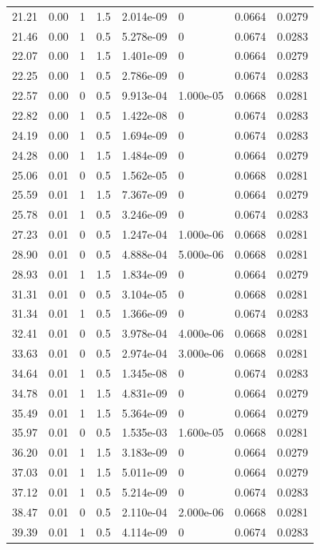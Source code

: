 \documentclass[preview]{standalone}
\begin{document}
{{\begin{tabular}{L{1.2cm}C{1.2cm} C{0.3cm}C{0.5cm} C{1.4cm}C{1.4cm} C{1.4cm}C{1.4cm}}
  21.21  &  0.00  & 1     & 1.5 &  2.014e-09  & 0  & 0.0664 &  0.0279   \\ 
  21.46  &  0.00  & 1     & 0.5 &  5.278e-09  & 0  & 0.0674 &  0.0283   \\ 
  22.07  &  0.00  & 1     & 1.5 &  1.401e-09  & 0  & 0.0664 &  0.0279   \\ 
  22.25  &  0.00  & 1     & 0.5 &  2.786e-09  & 0  & 0.0674 &  0.0283   \\ 
  22.57  &  0.00  & 0     & 0.5 &  9.913e-04  & 1.000e-05  & 0.0668 &  0.0281   \\ 
  22.82  &  0.00  & 1     & 0.5 &  1.422e-08  & 0  & 0.0674 &  0.0283   \\ 
  24.19  &  0.00  & 1     & 0.5 &  1.694e-09  & 0  & 0.0674 &  0.0283   \\ 
  24.28  &  0.00  & 1     & 1.5 &  1.484e-09  & 0  & 0.0664 &  0.0279   \\ 
  25.06  &  0.01  & 0     & 0.5 &  1.562e-05  & 0  & 0.0668 &  0.0281   \\ 
  25.59  &  0.01  & 1     & 1.5 &  7.367e-09  & 0  & 0.0664 &  0.0279   \\ 
  25.78  &  0.01  & 1     & 0.5 &  3.246e-09  & 0  & 0.0674 &  0.0283   \\ 
  27.23  &  0.01  & 0     & 0.5 &  1.247e-04  & 1.000e-06  & 0.0668 &  0.0281   \\ 
  28.90  &  0.01  & 0     & 0.5 &  4.888e-04  & 5.000e-06  & 0.0668 &  0.0281   \\ 
  28.93  &  0.01  & 1     & 1.5 &  1.834e-09  & 0  & 0.0664 &  0.0279   \\ 
  31.31  &  0.01  & 0     & 0.5 &  3.104e-05  & 0  & 0.0668 &  0.0281   \\ 
  31.34  &  0.01  & 1     & 0.5 &  1.366e-09  & 0  & 0.0674 &  0.0283   \\ 
  32.41  &  0.01  & 0     & 0.5 &  3.978e-04  & 4.000e-06  & 0.0668 &  0.0281   \\ 
  33.63  &  0.01  & 0     & 0.5 &  2.974e-04  & 3.000e-06  & 0.0668 &  0.0281   \\ 
  34.64  &  0.01  & 1     & 0.5 &  1.345e-08  & 0  & 0.0674 &  0.0283   \\ 
  34.78  &  0.01  & 1     & 1.5 &  4.831e-09  & 0  & 0.0664 &  0.0279   \\ 
  35.49  &  0.01  & 1     & 1.5 &  5.364e-09  & 0  & 0.0664 &  0.0279   \\ 
  35.97  &  0.01  & 0     & 0.5 &  1.535e-03  & 1.600e-05  & 0.0668 &  0.0281   \\ 
  36.20  &  0.01  & 1     & 1.5 &  3.183e-09  & 0  & 0.0664 &  0.0279   \\ 
  37.03  &  0.01  & 1     & 1.5 &  5.011e-09  & 0  & 0.0664 &  0.0279   \\ 
  37.12  &  0.01  & 1     & 0.5 &  5.214e-09  & 0  & 0.0674 &  0.0283   \\ 
  38.47  &  0.01  & 0     & 0.5 &  2.110e-04  & 2.000e-06  & 0.0668 &  0.0281   \\ 
  39.39  &  0.01  & 1     & 0.5 &  4.114e-09  & 0  & 0.0674 &  0.0283   \\ 
\hline 
\end{tabular} 

}}
\end{document}
